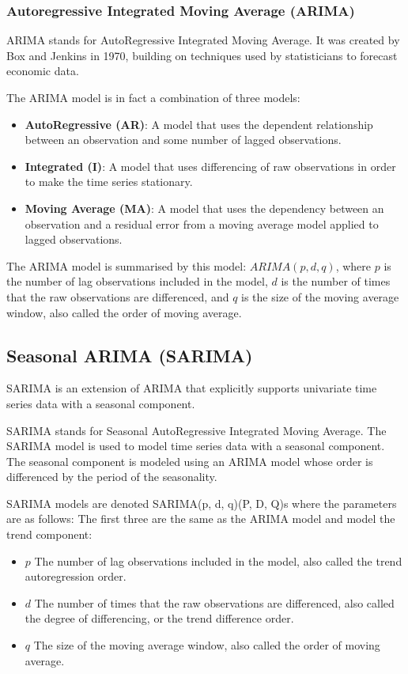 \documentclass[manuscript,screen,nonacm,11pt]{acmart}
\numberwithin{equation}{section}
\begin{document}
\subsubsection{Autoregressive Integrated Moving Average (ARIMA)}
ARIMA stands for AutoRegressive Integrated Moving Average. It was created by Box and Jenkins 
in 1970, building on techniques used by statisticians to forecast economic data.

The ARIMA model is in fact a combination of three models:
\begin{itemize}
\item \textbf{AutoRegressive (AR)}: A model that uses the dependent relationship between an observation and some number of lagged observations.
\item \textbf{Integrated (I)}: A model that uses differencing of raw observations in order to make the time series stationary.
\item \textbf{Moving Average (MA)}: A model that uses the dependency between an observation and a residual error from a moving average model applied to lagged observations.
\end{itemize} 

The ARIMA model is summarised by this model: $ARIMA(p,d,q)$, where $p$ is the number of lag observations included in the model, $d$ is the number of times that the raw observations are differenced, and $q$ is the size of the moving average window, also called the order of moving average.

\subsection{Seasonal ARIMA (SARIMA)}
SARIMA is an extension of ARIMA that explicitly supports univariate time series data with a seasonal component.

SARIMA stands for Seasonal 
AutoRegressive Integrated Moving Average.
The SARIMA model is used to model time series data with a seasonal component. 
The seasonal component is modeled using an ARIMA model whose order is differenced 
by the period of the seasonality.

SARIMA models are denoted SARIMA(p, d, q)(P, D, Q)s where the parameters are as 
follows:
The first three are the same as the ARIMA model and model the trend component:
\begin{itemize}
\item $p$ The number of lag observations included in the model, also 
called the trend autoregression order.
\item $d$ The number of times that the raw observations are differenced, also 
called the degree of differencing, or the trend difference order.
\item $q$ The size of the moving average window, also called the order of moving average.
\end{itemize}
\end{document}

